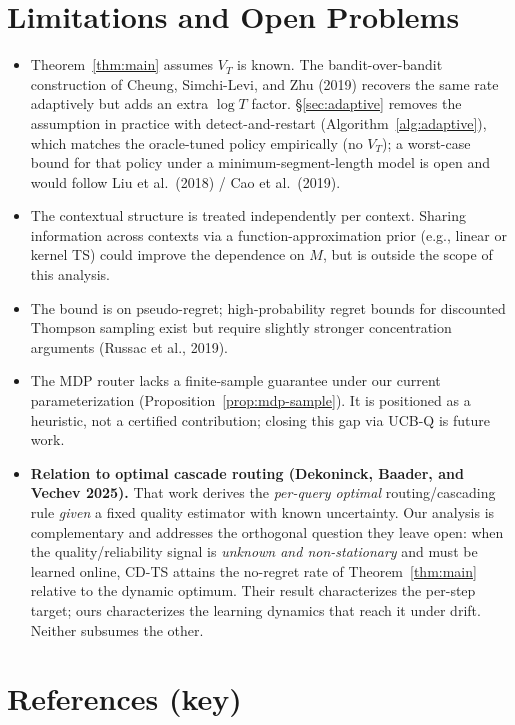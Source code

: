\documentclass[11pt]{article}
\theoremstyle{definition}
\begin{document}
\section{Limitations and Open Problems}
\label{sec:limitations}

\begin{itemize}
    \item Theorem~\ref{thm:main} assumes $V_T$ is known. The bandit-over-bandit construction of Cheung, Simchi-Levi, and Zhu (2019) recovers the same rate adaptively but adds an extra $\log T$ factor. \S\ref{sec:adaptive} removes the assumption in practice with detect-and-restart (Algorithm~\ref{alg:adaptive}), which matches the oracle-tuned policy empirically (no $V_T$); a worst-case bound for that policy under a minimum-segment-length model is open and would follow Liu et al.\ (2018) / Cao et al.\ (2019).
    \item The contextual structure is treated independently per context. Sharing information across contexts via a function-approximation prior (e.g., linear or kernel TS) could improve the dependence on $M$, but is outside the scope of this analysis.
    \item The bound is on pseudo-regret; high-probability regret bounds for discounted Thompson sampling exist but require slightly stronger concentration arguments (Russac et al., 2019).
    \item The MDP router lacks a finite-sample guarantee under our current parameterization (Proposition~\ref{prop:mdp-sample}). It is positioned as a heuristic, not a certified contribution; closing this gap via \textsc{UCB-Q} is future work.
    \item \textbf{Relation to optimal cascade routing (Dekoninck, Baader, and Vechev 2025).} That work derives the \emph{per-query optimal} routing/cascading rule \emph{given} a fixed quality estimator with known uncertainty. Our analysis is complementary and addresses the orthogonal question they leave open: when the quality/reliability signal is \emph{unknown and non-stationary} and must be learned online, CD-TS attains the no-regret rate of Theorem~\ref{thm:main} relative to the dynamic optimum. Their result characterizes the per-step target; ours characterizes the learning dynamics that reach it under drift. Neither subsumes the other.
\end{itemize}

\section*{References (key)}
\end{document}
